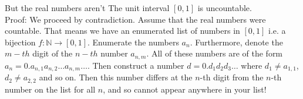 \documentclass{beamer}
\begin{document}
\begin{frame}{But the real numbers aren't}
The unit interval $[0, 1]$ is uncountable. \\
Proof:
We proceed by contradiction. Assume that the real numbers were countable. That means we have an enumerated list of numbers in $[0, 1]$ i.e. a bijection $f: \mathbb{N} \to [0, 1]$.
Enumerate the numbers $a_n$. Furthermore, denote the $m-th$ digit of the $n-th$ number $a_{n, m}.$
All of these numbers are of the form $a_n = 0.a_{n, 1} a_{n, 2} \ldots a_{n, m} \ldots$.
Then construct a number $d = 0.d_1 d_2 d_3 \ldots$ where $d_1 \ne a_{1, 1}$, $d_2 \ne a_{2, 2}$ and
so on. Then this number differs at the $n$-th digit from the $n$-th number on  the list for all $n$, and so 
cannot appear anywhere in your list!
\end{frame}


\end{document}
